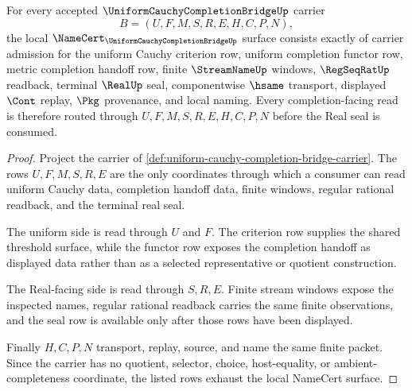 \begin{theorem}
\label{thm:uniform-cauchy-completion-bridge-namecert-obligations}
For every accepted $\UniformCauchyCompletionBridgeUp$ carrier
$$
B=(U,F,M,S,R,E,H,C,P,N),
$$
the local $\NameCert_{\UniformCauchyCompletionBridgeUp}$ surface consists exactly of carrier admission for the uniform Cauchy criterion row, uniform completion functor row, metric completion handoff row, finite $\StreamNameUp$ windows, $\RegSeqRatUp$ readback, terminal $\RealUp$ seal, componentwise $\hsame$ transport, displayed $\Cont$ replay, $\Pkg$ provenance, and local naming. Every completion-facing read is therefore routed through $U,F,M,S,R,E,H,C,P,N$ before the Real seal is consumed.
\end{theorem}
\begin{proof}
Project the carrier of \autoref{def:uniform-cauchy-completion-bridge-carrier}. The rows $U,F,M,S,R,E$ are the only coordinates through which a consumer can read uniform Cauchy data, completion handoff data, finite windows, regular rational readback, and the terminal real seal.

The uniform side is read through $U$ and $F$. The criterion row supplies the shared threshold surface, while the functor row exposes the completion handoff as displayed data rather than as a selected representative or quotient construction.

The Real-facing side is read through $S,R,E$. Finite stream windows expose the inspected names, regular rational readback carries the same finite observations, and the seal row is available only after those rows have been displayed.

Finally $H,C,P,N$ transport, replay, source, and name the same finite packet. Since the carrier has no quotient, selector, choice, host-equality, or ambient-completeness coordinate, the listed rows exhaust the local NameCert surface.
\end{proof}

